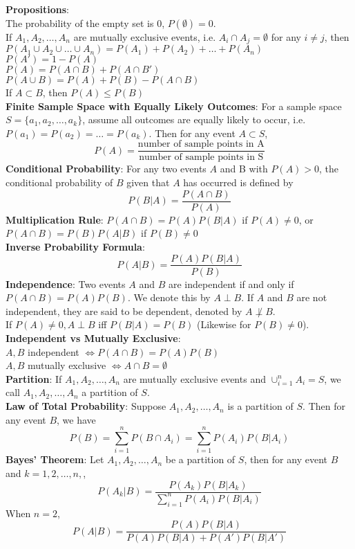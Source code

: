 \documentclass{article}
\begin{document}
\begin{multicols*}{2}
\textbf{Propositions}: \\
The probability of the empty set is 0, $P(\emptyset)=0$. \\
If $A_1,A_2,\dots,A_n$ are mutually exclusive events, i.e. $A_i\cap A_j=\emptyset$ for any $i\not=j$, then $P(A_1\cup A_2\cup\dots\cup A_n)=P(A_1)+P(A_2)+\dots+P(A_n)$\\
$P(A')=1-P(A)$\\
$P(A)=P(A\cap B)+P(A\cap B')$ \\
$P(A\cup B)=P(A)+P(B)-P(A\cap B)$\\
If $A\subset B$, then $P(A)\leq P(B)$\\
\textbf{Finite Sample Space with Equally Likely Outcomes}: For a sample space $S=\{a_1,a_2,\dots,a_k\}$, assume all outcomes are equally likely to occur, i.e. $P(a_1)=P(a_2)=\dots=P(a_k)$. Then for any event $A\subset S$, $$P(A)=\frac{\text{number of sample points in A}}{\text{number of sample points in S}}$$
\textbf{Conditional Probability}: For any two events $A$ and $ $B with $P(A) > 0$, the conditional probability of $B$ given that $A$ has occurred is defined by $$P(B|A)=\frac{P(A\cap B)}{P(A)}$$
\textbf{Multiplication Rule}: $P(A\cap B)=P(A)P(B|A) $ if $ P(A)\not=0$, or $P(A\cap B)=P(B)P(A|B) $ if $ P(B)\not=0$ \\
\textbf{Inverse Probability Formula}: $$P(A|B)=\frac{P(A)P(B|A)}{P(B)}$$
\textbf{Independence}: Two events $A$ and $B$ are independent if and only if $P(A \cap B) = P(A)P(B)$. We denote this by $A \perp B$. If $A$ and $B$ are not independent, they are said to be dependent, denoted by $A\not\perp B$. \\
If $P(A)\not=0, A\perp B$ iff $P(B|A)=P(B)$ (Likewise for $P(B)\not=0$). \\
\textbf{Independent vs Mutually Exclusive}: \\
$A,B$ independent $\Leftrightarrow P(A\cap B)=P(A)P(B)$ \\
$A,B$ mutually exclusive $\Leftrightarrow A\cap B=\emptyset$ \\
\textbf{Partition}: If $A_1,A_2,\dots,A_n$ are mutually exclusive events and $\cup^n_{i=1}A_i = S$, we call $A_1,A_2,\dots,A_n$ a partition of $S$.\\
\textbf{Law of Total Probability}: Suppose $A_1,A_2,\dots,A_n$ is a partition of $S$. Then for any event $B$, we have $$P(B)=\sum^n_{i=1}P(B\cap A_i)=\sum^n_{i=1}P(A_i)P(B|A_i)$$
\textbf{Bayes' Theorem}: Let $A_1,A_2,\dots,A_n$ be a partition of $S$, then for any event $B$ and $k = 1,2,\dots,n,$, $$P(A_k|B)=\frac{P(A_k)P(B|A_k)}{\sum_{i=1}^nP(A_i)P(B|A_i)}$$
When $n=2$, $$P(A|B)=\frac{P(A)P(B|A)}{P(A)P(B|A)+P(A')P(B|A')}$$

\end{multicols*}
\end{document}

